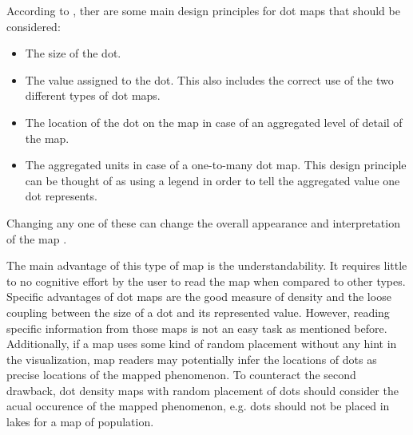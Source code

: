 According to \citeauthor{Tyner2010}, ther are some main design principles for dot maps that should be considered:
\begin{itemize}
\item The size of the dot.
\item The value assigned to the dot. This also includes the correct use of the two different types of dot maps.
\item The location of the dot on the map in case of an aggregated level of detail of the map.
\item The aggregated units in case of a one-to-many dot map. This design principle can be thought of as using a legend in order to tell the aggregated value one dot represents.
\end{itemize}
Changing any one of these can change the overall appearance and interpretation of the map .

The main advantage of this type of map is the understandability. It requires little to no cognitive effort by the user to read the map when compared to other types. Specific advantages of dot maps are the good measure of density and the loose coupling between the size of a dot and its represented value.
However, reading specific information from those maps is not an easy task as mentioned before. Additionally, if a map uses some kind of random placement without any hint in the visualization, map readers may potentially infer the locations of dots as precise locations of the mapped phenomenon. To counteract the second drawback, dot density maps with random placement of dots should consider the acual occurence of the mapped phenomenon, e.g. dots should not be placed in lakes for a map of population.